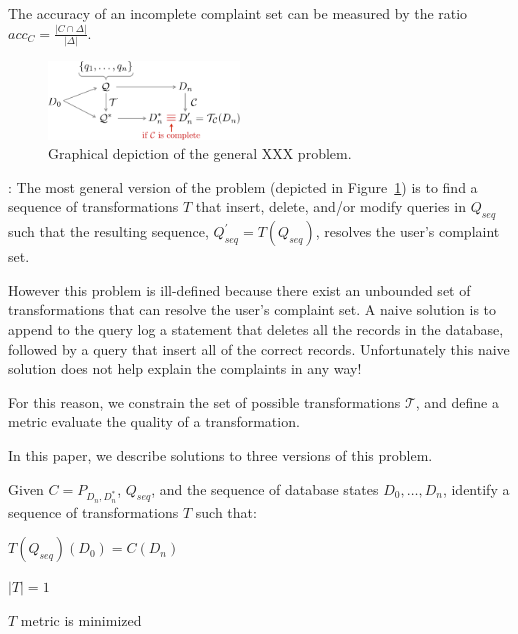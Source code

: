 The accuracy of an incomplete complaint set can be measured by the ratio $acc_C = \frac{|C \cap \Delta|}{|\Delta|}$.


\begin{figure}[h]
\centering
\includegraphics[width = 2in]{figures/probtransform}
\caption{Graphical depiction of the general XXX problem.}
\label{f:probtransform} 
\end{figure}



: The most general version of the problem
(depicted in Figure~\ref{f:probtransform}) is to find a sequence of
transformations $T$ that insert, delete, and/or modify queries in $Q_{seq}$ 
such that the resulting sequence, $Q^'_{seq} = T(Q_{seq})$, resolves the user's complaint set. 

However this problem is ill-defined because there exist an unbounded set of transformations that
can resolve the user's complaint set.  A naive solution is to append to the query log a statement
that deletes all the records in the database, followed by a query that insert all of the correct records.
Unfortunately this naive solution does not help explain the complaints in any way!

For this reason, we constrain the set of possible transformations $\mathcal{T}$,
and define a metric evaluate the quality of a transformation.


In this paper, we describe solutions to three versions of this problem.

\begin{problem}\label{prob:complete}
Given $C = P_{D_n, D^*_n}$, $Q_{seq}$, and the sequence of database states $D_0,\ldots,D_n$, 
identify a sequence of transformations $T$ such that:
\begin{CompactItemize}
\item $T(Q_{seq})(D_0) = C(D_n)$
\item $|T| = 1$
\item $T$ metric is minimized
\end{CompactItemize}
\end{problem}

